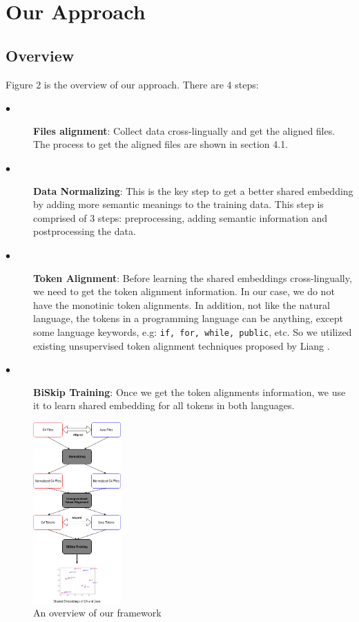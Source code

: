 \section{Our Approach}
\subsection{Overview}
Figure 2 is the overview of our approach. There are 4 steps:
\begin{description}
    \item [$\bullet$] \textbf{Files alignment}: Collect data cross-lingually and get the aligned files. The process to get the aligned files are shown in section 4.1.
	\item [$\bullet$]\textbf{Data Normalizing}: This is the key step to get a better shared embedding by adding more semantic meanings to the training data. This step is comprised of 3 steps: preprocessing, adding semantic information and postprocessing the data.
	\item [$\bullet$] \textbf{Token Alignment}: Before learning the shared embeddings cross-lingually, we need to get the token alignment information. In our case, we do not have the monotinic token alignments. In addition, not like the natural language, the tokens in a programming language can be anything, except some language keywords, e.g: \texttt{if, for, while, public}, etc. So we utilized existing unsupervised token alignment techniques proposed by Liang \cite{liang2006alignment}.
	\item [$\bullet$] \textbf{BiSkip Training}: Once we get the token alignments information, we use it to learn shared embedding for all tokens in both languages.
\end{description}

\begin{figure}[t!]
	\includegraphics[width=0.30\textwidth]{approach}
	\caption{An overview of our framework}
	\label{fig:clf}
\end{figure}
 



